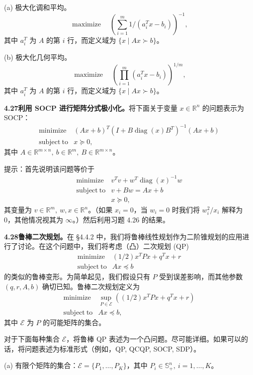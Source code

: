 \documentclass[UTF8,12pt,a4paper,fontset=fandol]{ctexart}
\begin{document}
(a) 极大化调和平均。
\[
\mathop{\mathrm{maximize}}\quad \left(\sum_{i=1}^m 1/(a_i^Tx-b_i)\right)^{-1},
\]
其中 $a_i^T$ 为 $A$ 的第 $i$ 行，而定义域为 $\{x\mid Ax\succ b\}$。

(b) 极大化几何平均。
\[
\mathop{\mathrm{maximize}}\quad \left(\prod_{i=1}^m(a_i^Tx-b_i)\right)^{1/m},
\]
其中 $a_i^T$ 为 $A$ 的第 $i$ 行，而定义域为 $\{x\mid Ax\succ b\}$。

\noindent\textbf{4.27\quad 利用 SOCP 进行矩阵分式极小化。}\quad 将下面关于变量 $x\in\mathbb{R}^n$ 的问题表示为 SOCP：
\[
\begin{array}{ll}
\mathop{\mathrm{minimize}} & (Ax+b)^T(I+B\operatorname{diag}(x)B^T)^{-1}(Ax+b)\\
\mathrm{subject\ to} & x\succeq0,
\end{array}
\]
其中 $A\in\mathbb{R}^{m\times n},\ b\in\mathbb{R}^m,\ B\in\mathbb{R}^{m\times n}$。

提示：首先说明该问题等价于
\[
\begin{array}{ll}
\mathop{\mathrm{minimize}} & v^Tv+w^T\operatorname{diag}(x)^{-1}w\\
\mathrm{subject\ to} & v+Bw=Ax+b\\
& x\succeq0,
\end{array}
\]
其变量为 $v\in\mathbb{R}^m,\ w,x\in\mathbb{R}^n$。（如果 $x_i=0$，当 $w_i=0$ 时我们将 $w_i^2/x_i$ 解释为 0，其他情况视其为 $\infty$。）然后利用习题 4.26 的结果。

\noindent\textbf{4.28\quad 鲁棒二次规划。}\quad 在 \S4.4.2 中，我们将鲁棒线性规划作为二阶锥规划的应用进行了讨论。在这个问题中，我们将考虑（凸）二次规划 (QP)
\[
\begin{array}{ll}
\mathop{\mathrm{minimize}} & (1/2)x^TPx+q^Tx+r\\
\mathrm{subject\ to} & Ax\preceq b
\end{array}
\]
的类似的鲁棒变形。为简单起见，我们假设只有 $P$ 受到误差影响，而其他参数 $(q,r,A,b)$ 确切已知。鲁棒二次规划定义为
\[
\begin{array}{ll}
\mathop{\mathrm{minimize}} & \sup_{P\in\mathcal{E}}\left((1/2)x^TPx+q^Tx+r\right)\\
\mathrm{subject\ to} & Ax\preceq b,
\end{array}
\]
其中 $\mathcal{E}$ 为 $P$ 的可能矩阵的集合。

对于下面每种集合 $\mathcal{E}$，将鲁棒 QP 表述为一个凸问题。尽可能详细。如果可以的话，将问题表述为标准形式（例如，QP, QCQP, SOCP, SDP）。

(a) 有限个矩阵的集合：$\mathcal{E}=\{P_1,\ldots,P_K\}$，其中 $P_i\in\mathbb{S}_+^n,\ i=1,\ldots,K$。
\end{document}
